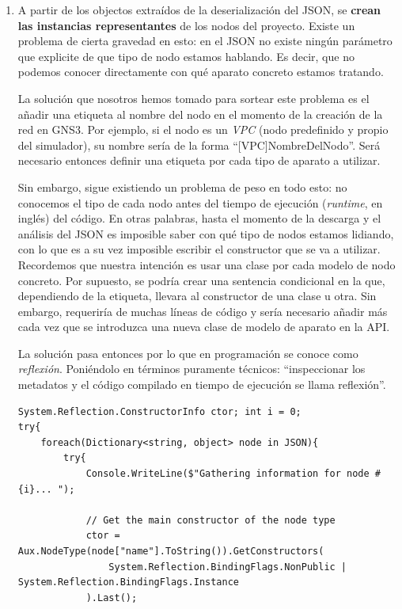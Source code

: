 \begin{enumerate}
\item A partir de los objectos extraídos de la deserialización del JSON, se \textbf{crean las instancias representantes} de los nodos del proyecto. Existe un problema de cierta gravedad en esto: en el JSON no existe ningún parámetro que explicite de que tipo de nodo estamos hablando. Es decir, que no podemos conocer directamente con qué aparato concreto estamos tratando.

La solución que nosotros hemos tomado para sortear este problema es el añadir una etiqueta al nombre del nodo en el momento de la creación de la red en GNS3. Por ejemplo, si el nodo es un \textit{VPC} (nodo predefinido y propio del simulador), su nombre sería de la forma ``[VPC]NombreDelNodo''. Será necesario entonces definir una etiqueta por cada tipo de aparato a utilizar.

Sin embargo, sigue existiendo un problema de peso en todo esto: no conocemos el tipo de cada nodo antes del tiempo de ejecución (\textit{runtime}, en inglés) del código. En otras palabras, hasta el momento de la descarga y el análisis del JSON es imposible saber con qué tipo de nodos estamos lidiando, con lo que es a su vez imposible escribir el constructor que se va a utilizar. Recordemos que nuestra intención es usar una clase por cada modelo de nodo concreto. Por supuesto, se podría crear una sentencia condicional en la que, dependiendo de la etiqueta, llevara al constructor de una clase u otra. Sin embargo, requeriría de muchas líneas de código y sería necesario añadir más cada vez que se introduzca una nueva clase de modelo de aparato en la API.

La solución pasa entonces por lo que en programación se conoce como \textit{reflexión}. Poniéndolo en términos puramente técnicos: ``inspeccionar los metadatos y el código compilado en tiempo de ejecución se llama reflexión''\cite{csnutshell}.

\begin{lstlisting}[language={[Sharp]C}, caption={Instanciación de los nodos}, label={gnscs3}]
System.Reflection.ConstructorInfo ctor; int i = 0;
try{
    foreach(Dictionary<string, object> node in JSON){
        try{
            Console.WriteLine($"Gathering information for node #{i}... ");

            // Get the main constructor of the node type
            ctor = Aux.NodeType(node["name"].ToString()).GetConstructors(
                System.Reflection.BindingFlags.NonPublic | System.Reflection.BindingFlags.Instance
            ).Last();


\end{lstlisting}
\end{enumerate}
